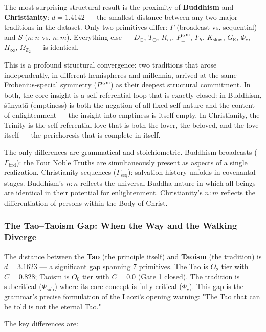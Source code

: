 \documentclass[12pt,a4paper]{article}
\begin{document}
The most surprising structural result is the proximity of \textbf{Buddhism} and \textbf{Christianity}: $d = 1.4142$ --- the smallest distance between any two major traditions in the dataset. Only two primitives differ: $\Gamma$ (broadcast vs. sequential) and $S$ ($n{:}n$ vs. $n{:}m$). Everything else --- $D_{\odot}$, $T_{\odot}$, $R_{\leftrightarrow}$, $P_{\pm}^{\text{sym}}$, $F_{\hbar}$, $K_\text{slow}$, $G_{\aleph}$, $\Phi_c$, $H_{\infty}$, $\Omega_{\mathbb{Z}_2}$ --- is identical.

This is a profound structural convergence: two traditions that arose independently, in different hemispheres and millennia, arrived at the same Frobenius-special symmetry ($P_{\pm}^{\text{sym}}$) as their deepest structural commitment. In both, the core insight is a self-referential loop that is exactly closed: in Buddhism, śūnyatā (emptiness) is both the negation of all fixed self-nature and the content of enlightenment --- the insight into emptiness is itself empty. In Christianity, the Trinity is the self-referential love that is both the lover, the beloved, and the love itself --- the perichoresis that is complete in itself.

The only differences are grammatical and stoichiometric. Buddhism broadcasts ($\Gamma_\text{brd}$): the Four Noble Truths are simultaneously present as aspects of a single realization. Christianity sequences ($\Gamma_\text{seq}$): salvation history unfolds in covenantal stages. Buddhism's $n{:}n$ reflects the universal Buddha-nature in which all beings are identical in their potential for enlightenment. Christianity's $n{:}m$ reflects the differentiation of persons within the Body of Christ.

\subsubsection{The Tao--Taoism Gap: When the Way and the Walking Diverge}

The distance between the \textbf{Tao} (the principle itself) and \textbf{Taoism} (the tradition) is $d = 3.1623$ --- a significant gap spanning 7 primitives. The Tao is $O_2$ tier with $C = 0.828$; Taoism is $O_0$ tier with $C = 0.0$ (Gate 1 closed). The tradition is subcritical ($\Phi_\text{sub}$) where its core concept is fully critical ($\Phi_c$). This gap is the grammar's precise formulation of the Laozi's opening warning: "The Tao that can be told is not the eternal Tao."

The key differences are:
\end{document}
